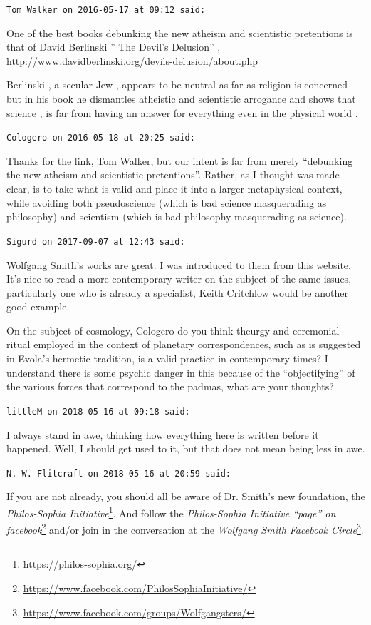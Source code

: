 \begin{footnotesize}
\begin{sffamily}
\texttt{Tom Walker on 2016-05-17 at 09:12 said:}

One of the best books debunking the new atheism and scientistic pretentions is that of David Berlinski '' The Devil's Delusion'' , \url{http://www.davidberlinski.org/devils-delusion/about.php}

Berlinski , a secular Jew , appears to be neutral as far as religion is concerned but in his book he dismantles atheistic and scientistic arrogance and shows that science , is far from having an answer for everything even in the physical world .

\hfill

\texttt{Cologero on 2016-05-18 at 20:25 said:}

Thanks for the link, Tom Walker, but our intent is far from merely ``debunking the new atheism and scientistic pretentions''. Rather, as I thought was made clear, is to take what is valid and place it into a larger metaphysical context, while avoiding both pseudoscience (which is bad science masquerading as philosophy) and scientism (which is bad philosophy masquerading as science).

\hfill

\texttt{Sigurd on 2017-09-07 at 12:43 said:}

Wolfgang Smith's works are great. I was introduced to them from this website. It's nice to read a more contemporary writer on the subject of the same issues, particularly one who is already a specialist, Keith Critchlow would be another good example.

On the subject of cosmology, Cologero do you think theurgy and ceremonial ritual employed in the context of planetary correspondences, such as is suggested in Evola's hermetic tradition, is a valid practice in contemporary times? I understand there is some psychic danger in this because of the ``objectifying'' of the various forces that correspond to the padmas, what are your thoughts?

\hfill

\texttt{littleM on 2018-05-16 at 09:18 said:}

I always stand in awe, thinking how everything here is written before it happened. Well, I should get used to it, but that does not mean being less in awe.

\hfill

\texttt{N. W. Flitcraft on 2018-05-16 at 20:59 said:}

If you are not already, you should all be aware of Dr. Smith's new foundation, the \textit{Philos-Sophia Initiative}\footnote{\url{https://philos-sophia.org/}}. And follow the \textit{Philos-Sophia Initiative ``page'' on facebook}\footnote{\url{https://www.facebook.com/PhilosSophiaInitiative/}} and/or join in the conversation at the \textit{Wolfgang Smith Facebook Circle}\footnote{\url{https://www.facebook.com/groups/Wolfgangsters/}}.

\end{sffamily}
\end{footnotesize}

